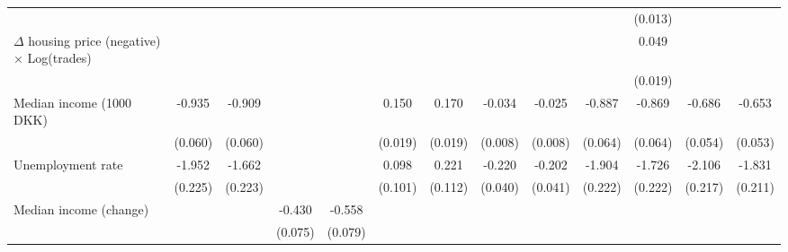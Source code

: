 \begin{sidewaystable}[htbp]
\begin{tabular}{l*{12}{c}}
                    &                    &                    &                    &                    &                    &                    &                    &                    &                    &     (0.013)        &                    &                    \\
$\Delta$ housing price (negative) $\times$ Log(trades)&                    &                    &                    &                    &                    &                    &                    &                    &                    &       0.049\sym{*} &                    &                    \\
                    &                    &                    &                    &                    &                    &                    &                    &                    &                    &     (0.019)        &                    &                    \\
Median income (1000 DKK)&      -0.935\sym{**}&      -0.909\sym{**}&                    &                    &       0.150\sym{**}&       0.170\sym{**}&      -0.034\sym{**}&      -0.025\sym{**}&      -0.887\sym{**}&      -0.869\sym{**}&      -0.686\sym{**}&      -0.653\sym{**}\\
                    &     (0.060)        &     (0.060)        &                    &                    &     (0.019)        &     (0.019)        &     (0.008)        &     (0.008)        &     (0.064)        &     (0.064)        &     (0.054)        &     (0.053)        \\
Unemployment rate   &      -1.952\sym{**}&      -1.662\sym{**}&                    &                    &       0.098        &       0.221\sym{*} &      -0.220\sym{**}&      -0.202\sym{**}&      -1.904\sym{**}&      -1.726\sym{**}&      -2.106\sym{**}&      -1.831\sym{**}\\
                    &     (0.225)        &     (0.223)        &                    &                    &     (0.101)        &     (0.112)        &     (0.040)        &     (0.041)        &     (0.222)        &     (0.222)        &     (0.217)        &     (0.211)        \\
Median income (change)&                    &                    &      -0.430\sym{**}&      -0.558\sym{**}&                    &                    &                    &                    &                    &                    &                    &                    \\
                    &                    &                    &     (0.075)        &     (0.079)        &                    &                    &                    &                    &                    &                    &                    &                    \\

\end{tabular}
\end{sidewaystable}
